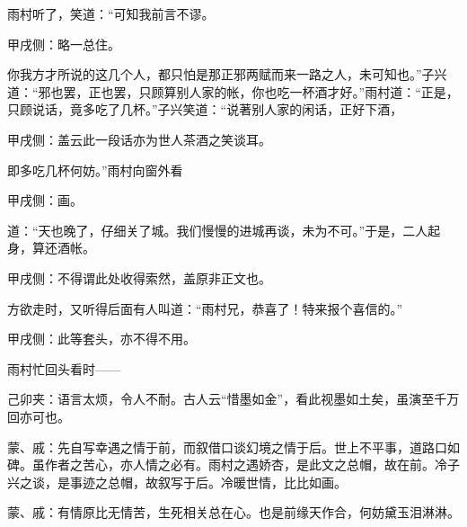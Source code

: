\begin{parag}
    雨村听了，笑道：“可知我前言不谬。\begin{note}甲戌侧：略一总住。\end{note}你我方才所说的这几个人，都只怕是那正邪两赋而来一路之人，未可知也。”子兴道：“邪也罢，正也罢，只顾算别人家的帐，你也吃一杯酒才好。”雨村道：“正是，只顾说话，竟多吃了几杯。”子兴笑道：“说著别人家的闲话，正好下酒，\begin{note}甲戌侧：盖云此一段话亦为世人茶酒之笑谈耳。\end{note}即多吃几杯何妨。”雨村向窗外看\begin{note}甲戌侧：画。\end{note}道：“天也晚了，仔细关了城。我们慢慢的进城再谈，未为不可。”于是，二人起身，算还酒帐。\begin{note}甲戌侧：不得谓此处收得索然，盖原非正文也。\end{note}
\end{parag}


\begin{parag}
    方欲走时，又听得后面有人叫道：“雨村兄，恭喜了！特来报个喜信的。”
\end{parag}


\begin{parag}
    \begin{note}甲戌侧：此等套头，亦不得不用。\end{note}雨村忙回头看时——\begin{note}己卯夹：语言太烦，令人不耐。古人云“惜墨如金”，看此视墨如土矣，虽演至千万回亦可也。\end{note}
\end{parag}


\begin{parag}
    \begin{note}蒙、戚：先自写幸遇之情于前，而叙借口谈幻境之情于后。世上不平事，道路口如碑。虽作者之苦心，亦人情之必有。雨村之遇娇杏，是此文之总帽，故在前。冷子兴之谈，是事迹之总帽，故叙写于后。冷暖世情，比比如画。\end{note}
\end{parag}


\begin{parag}
    \begin{note}蒙、戚：有情原比无情苦，生死相关总在心。也是前缘天作合，何妨黛玉泪淋淋。\end{note}
\end{parag}

